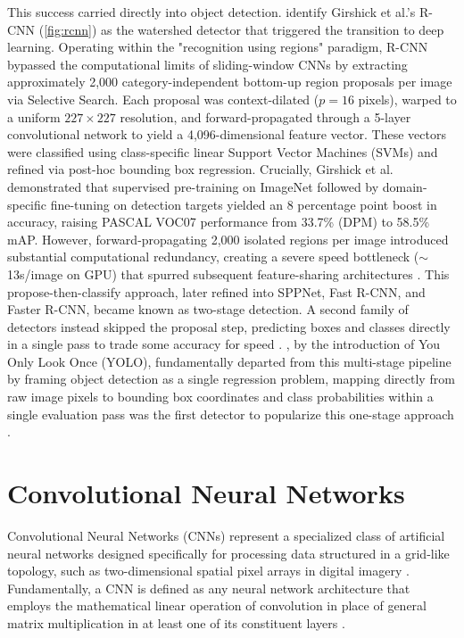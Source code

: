 This success carried directly into object detection. \textcite{zou_obj_2023} identify Girshick et al.'s R-CNN (\ref{fig:rcnn}) \parencite{girshick_2014_rcnn} as the watershed detector that triggered the transition to deep learning. Operating within the "recognition using regions" paradigm, R-CNN bypassed the computational limits of sliding-window CNNs by extracting approximately 2,000 category-independent bottom-up region proposals per image via Selective Search. Each proposal was context-dilated ($p=16$ pixels), warped to a uniform $227 \times 227$ resolution, and forward-propagated through a 5-layer convolutional network to yield a 4,096-dimensional feature vector. These vectors were classified using class-specific linear Support Vector Machines (SVMs) and refined via post-hoc bounding box regression. Crucially, Girshick et al. demonstrated that supervised pre-training on ImageNet followed by domain-specific fine-tuning on detection targets yielded an 8 percentage point boost in accuracy, raising PASCAL VOC07 performance from 33.7\% (DPM) to 58.5\% mAP. However, forward-propagating 2,000 isolated regions per image introduced substantial computational redundancy, creating a severe speed bottleneck ($\sim$13s/image on GPU) that spurred subsequent feature-sharing architectures \parencite{girshick_2014_rcnn}. This propose-then-classify approach, later refined into SPPNet, Fast R-CNN, and Faster R-CNN, became known as two-stage detection. A second family of detectors instead skipped the proposal step, predicting boxes and classes directly in a single pass to trade some accuracy for speed \parencite{zou_obj_2023}. \textcite{redmon_you_2016}, by the introduction of You Only Look Once (YOLO), fundamentally departed from this multi-stage pipeline by framing object detection as a single regression problem, mapping directly from raw image pixels to bounding box coordinates and class probabilities within a single evaluation pass  was the first detector to popularize this one-stage approach \parencite{redmon_you_2016}.

\section{Convolutional Neural Networks}
\label{sec:cnn}

Convolutional Neural Networks (CNNs) represent a specialized class of artificial neural networks designed specifically for processing data structured in a grid-like topology, such as two-dimensional spatial pixel arrays in digital imagery \parencite{Goodfellow-et-al-2016}. Fundamentally, a CNN is defined as any neural network architecture that employs the mathematical linear operation of convolution in place of general matrix multiplication in at least one of its constituent layers \parencite{Goodfellow-et-al-2016}.

